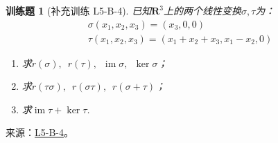 \documentclass[12pt,fontset=fandol]{ctexart}
\newtheorem{exercise}{训练题}[section]
\begin{document}
\begin{exercise}[补充训练 L5-B-4]\label{prob:L5-B-4}
已知$\mathbf{R}^3$上的两个线性变换$\sigma,\tau$为：
        \begin{gather*}
            \sigma(x_1,x_2,x_3)=(x_3,0,0) \\
            \tau(x_1,x_2,x_3)=(x_1+x_2+x_3,x_1-x_2,0)
        \end{gather*}
        \begin{enumerate}
            \item 求$r(\sigma),\enspace r(\tau),\enspace \operatorname{im}\sigma,\enspace \ker\sigma$；

            \item 求$r(\tau\sigma),\enspace r(\sigma\tau),\enspace r(\sigma+\tau)$；

            \item 求$\operatorname{im}\tau+\ker\tau$.
        \end{enumerate}
\end{exercise}
\noindent 来源：\href{https://github.com/yhwu-is/Linear-Algebra-Left-Undone/blob/new/%E8%AE%B2%E4%B9%89/%E4%B8%93%E9%A2%98/5%20%E7%BA%BF%E6%80%A7%E6%98%A0%E5%B0%84.tex}{L5-B-4}。
\end{document}
